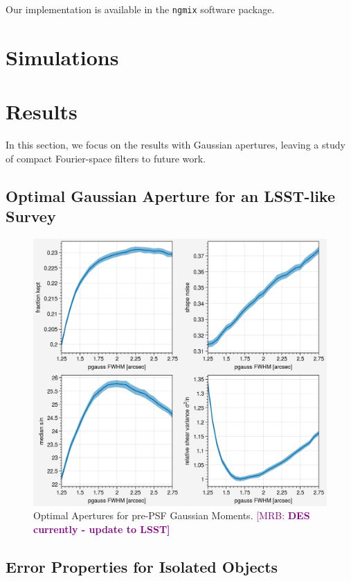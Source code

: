 \documentclass[twocolappendix, appendixfloats, numberedappendix, twocolumn, apj]{openjournal}
\newcommand{\mrb}[1]{\textcolor{purple}{[MRB: \bf #1]}\xspace}
\begin{document}
Our implementation is available in the \texttt{ngmix} software package.

\section{Simulations}


\section{Results}

In this section, we focus on the results with Gaussian apertures, leaving a study of
compact Fourier-space filters to future work.

\subsection{Optimal Gaussian Aperture for an LSST-like Survey}

\begin{figure}
    \includegraphics[width=\columnwidth]{figures/optap.png}

    \caption{Optimal Apertures for pre-PSF Gaussian Moments. \mrb{DES currently - update to LSST}
    \label{fig:opap}}

\end{figure}


\subsection{Error Properties for Isolated Objects}
\end{document}
